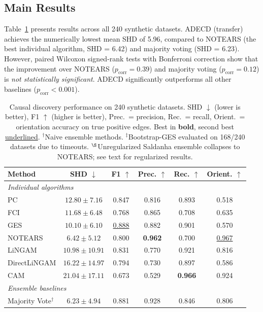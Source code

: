 \documentclass{article}
\newcommand{\adecd}{\textsc{ADECD}}
\begin{document}
\subsection{Main Results}

Table~\ref{tab:main} presents results across all 240 synthetic datasets.
\adecd{} (transfer) achieves the numerically lowest mean SHD of 5.96, compared to NOTEARS (the best individual algorithm, SHD = 6.42) and majority voting (SHD = 6.23).
However, paired Wilcoxon signed-rank tests with Bonferroni correction show that the improvement over NOTEARS ($p_{\mathrm{corr}} = 0.39$) and majority voting ($p_{\mathrm{corr}} = 0.12$) is \emph{not statistically significant}.
\adecd{} significantly outperforms all other baselines ($p_{\mathrm{corr}} < 0.001$).

\begin{table}[t]
\caption{Causal discovery performance on 240 synthetic datasets. SHD $\downarrow$ (lower is better), F1 $\uparrow$ (higher is better), Prec.\ = precision, Rec.\ = recall, Orient.\ = orientation accuracy on true positive edges. Best in \textbf{bold}, second best \underline{underlined}. $^\dagger$Naive ensemble methods. $^\ddagger$Bootstrap-GES evaluated on 168/240 datasets due to timeouts. $^\S$Unregularized Saldanha ensemble collapses to NOTEARS; see text for regularized results.}
\label{tab:main}
\centering
\small
\begin{tabular}{lccccc}
\toprule
Method & SHD $\downarrow$ & F1 $\uparrow$ & Prec. $\uparrow$ & Rec. $\uparrow$ & Orient. $\uparrow$ \\
\midrule
\multicolumn{6}{l}{\emph{Individual algorithms}} \\
PC & $12.80 \pm 7.16$ & 0.847 & 0.816 & 0.893 & 0.518 \\
FCI & $11.68 \pm 6.48$ & 0.768 & 0.865 & 0.708 & 0.635 \\
GES & $10.10 \pm 6.10$ & \underline{0.888} & 0.882 & 0.901 & 0.570 \\
NOTEARS & $\underline{6.42 \pm 5.12}$ & 0.800 & \textbf{0.962} & 0.700 & \underline{0.967} \\
LiNGAM & $10.98 \pm 10.91$ & 0.831 & 0.770 & 0.921 & 0.816 \\
DirectLiNGAM & $16.22 \pm 14.97$ & 0.794 & 0.730 & 0.897 & 0.586 \\
CAM & $21.04 \pm 17.11$ & 0.673 & 0.529 & \textbf{0.966} & 0.924 \\
\midrule
\multicolumn{6}{l}{\emph{Ensemble baselines}} \\
Majority Vote$^\dagger$ & $6.23 \pm 4.94$ & 0.881 & 0.928 & 0.846 & 0.806 \\

\end{tabular}
\end{table}
\end{document}
